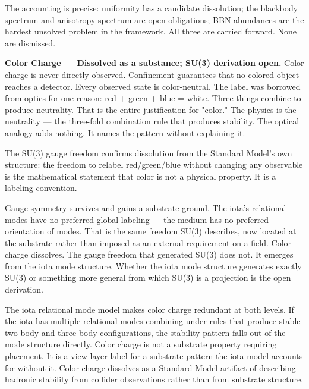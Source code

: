 \documentclass[11pt,letterpaper]{article}
\begin{document}
The accounting is precise: uniformity has a candidate dissolution; the blackbody spectrum and anisotropy spectrum are open obligations; BBN abundances are the hardest unsolved problem in the framework. All three are carried forward. None are dismissed.

\textbf{Color Charge --- Dissolved as a substance; SU(3) derivation open.} Color charge is never directly observed. Confinement guarantees that no colored object reaches a detector. Every observed state is color-neutral. The label was borrowed from optics for one reason: red + green + blue = white. Three things combine to produce neutrality. That is the entire justification for "color." The physics is the neutrality --- the three-fold combination rule that produces stability. The optical analogy adds nothing. It names the pattern without explaining it.

The SU(3) gauge freedom confirms dissolution from the Standard Model's own structure: the freedom to relabel red/green/blue without changing any observable is the mathematical statement that color is not a physical property. It is a labeling convention.

Gauge symmetry survives and gains a substrate ground. The iota's relational modes have no preferred global labeling --- the medium has no preferred orientation of modes. That is the same freedom SU(3) describes, now located at the substrate rather than imposed as an external requirement on a field. Color charge dissolves. The gauge freedom that generated SU(3) does not. It emerges from the iota mode structure. Whether the iota mode structure generates exactly SU(3) or something more general from which SU(3) is a projection is the open derivation.

The iota relational mode model makes color charge redundant at both levels. If the iota has multiple relational modes combining under rules that produce stable two-body and three-body configurations, the stability pattern falls out of the mode structure directly. Color charge is not a substrate property requiring placement. It is a view-layer label for a substrate pattern the iota model accounts for without it. Color charge dissolves as a Standard Model artifact of describing hadronic stability from collider observations rather than from substrate structure.
\end{document}
